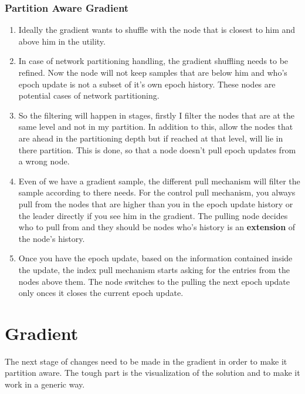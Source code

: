 \documentclass[a4paper, 11pt]{article}
\begin{document}
\subsubsection{Partition Aware Gradient}

\begin{enumerate}

\item Ideally the gradient wants to shuffle with the node that is closest to him and above him in the utility.

\item In case of network partitioning handling, the gradient shuffling needs to be refined. Now the node will not keep samples that are below him and who's epoch update is not a subset of it's own epoch history. These nodes are potential cases of network partitioning.

\item So the filtering will happen in stages, firstly I filter the nodes that are at the same level and not in my partition. In addition to this, 
allow the nodes that are ahead in the partitioning depth but if reached at that level, will lie in there partition. This is done, so that a node doesn't pull epoch updates from a wrong node.

\item Even of we have a gradient sample, the different pull mechanism will filter the sample according to there needs. For the control pull mechanism, you always pull from the nodes that are higher than you in the epoch update history or the leader directly if you see him in the gradient.
The pulling node decides who to pull from and they should be nodes who's history is an \textbf{extension} of the node's history.


\item Once you have the epoch update, based on the information contained inside the update, the index pull mechanism starts asking for the entries from the nodes above them. The node switches to the pulling the next epoch update only onces it closes the current epoch update.

\end{enumerate}



\section{Gradient}

The next stage of changes need to be made in the gradient in order to make it partition aware. The tough part is the visualization of the solution and to make it work in a generic way.
\end{document}
